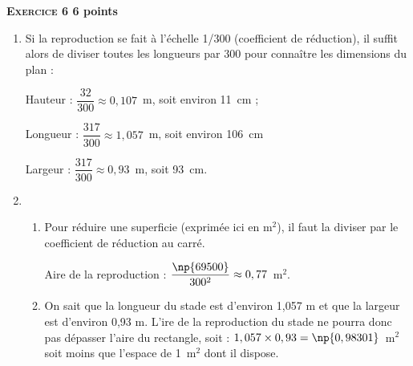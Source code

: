 \textbf{\textsc{Exercice 6} \hfill 6 points}

\medskip

\begin{enumerate}
\item Si la reproduction se fait à l'échelle 1/300 (coefficient de réduction), il suffit alors de diviser toutes les longueurs par 300 pour connaître les dimensions du plan :

Hauteur : $\dfrac{32}{300}\approx  0,107$~m, soit environ 11~cm ;

Longueur : $\dfrac{317}{300}\approx 1,057$~m, soit environ 106~cm

Largeur : $\dfrac{317}{300}\approx 0,93$~m, soit 93~cm.
\item  
	\begin{enumerate}
		\item Pour réduire une superficie (exprimée ici en m$^2$), il faut la diviser par le coefficient de réduction au carré.
		
Aire de la reproduction  : $\dfrac{\np{69500}}{300^2} \approx  0,77$~m$^2$.
		\item On sait que la longueur du stade est d'environ 1,057 m et que la largeur est d'environ 0,93 m. L'ire de la reproduction du stade ne pourra donc pas dépasser l'aire du rectangle, soit : $1,057 \times  0,93 = \np{0,98301}$~m$^2$ soit moins 
que l'espace de 1~m$^2$ dont il dispose.
	\end{enumerate}
\end{enumerate}

\vspace{0,25cm}

